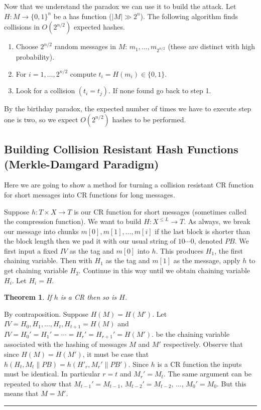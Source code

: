 \documentclass[twoside]{article}
\newcounter{lecnum}
\newtheorem{theorem}{Theorem}[lecnum]
\newenvironment{proof}{{\bf Proof:}}{\hfill\rule{2mm}{2mm}}
\begin{document}
Now that we understand the paradox we can use it to build the attack. Let $H: M \rightarrow \{0,1\}^n$ be a has function ($|M| \gg 2^n$). The following algorithm finds collisions in $O(2^{n/2})$ expected hashes.

\begin{enumerate}
\item Choose $2^{n/2}$ random messages in $M$: $m_1, ..., m_{2^{n/2}}$ (these are distinct with high probability).
\item For $i=1, ..., 2^{n/2}$ compute $t_i = H(m_i) \in \{0,1\}$.
\item Look for a collision $(t_i = t_j)$. If none found go back to step 1.
\end{enumerate}

By the birthday paradox, the expected number of times we have to execute step one is two, so we expect $O(2^{n/2})$ hashes to be performed.

\subsection{Building Collision Resistant Hash Functions (Merkle-Damgard Paradigm)}

Here we are going to show a method for turning a collision resistant CR function for short messages into CR functions for long messages.

Suppose $h: T\times X \rightarrow T$ is our CR function for short messages (sometimes called the compression function). We want to build $H: X^{\leq L} \rightarrow T$. As always, we break our message into chunks $m[0], m[1], ..., m[i]$ if the last block is shorter than the block length then we pad it with our usual string of $10 \cdots 0$, denoted $PB$. We first input a fixed $IV$ as the tag and $m[0]$ into $h$. This produces $H_1$, the first chaining variable. Then with $H_1$ as the tag and $m[1]$ as the message, apply $h$ to get chaining variable $H_2$. Continue in this way until we obtain chaining variable $H_{i}$. Let $H_i = H$. 

\begin{theorem}
If $h$ is a CR then so is $H$.
\end{theorem}
\begin{proof}
By contraposition. Suppose $H(M) = H(M')$. Let $IV = H_0, H_1, ..., H_t, H_{t+1} = H(M)$ and $IV = H_0' = H_1' = \cdots = H_r' = H_{r+1}' = H(M')$. be the chaining variable associated with the hashing of messages $M$ and $M'$ respectively. Observe that since $H(M) = H(M')$, it must be case that $h(H_t, M_t \parallel PB) = h(H'_r, M_r' \parallel PB')$. Since $h$ is a CR function the inputs must be identical. In particular $r = t$ and $M_r' = M_t$. The same argument can be repeated to show that $M_{t-1}' = M_{t-1}$, $M_{t-2}' = M_{t-2}$, ..., $M_0' = M_0$. But this means that $M = M'$.    
\end{proof}
\end{document}
